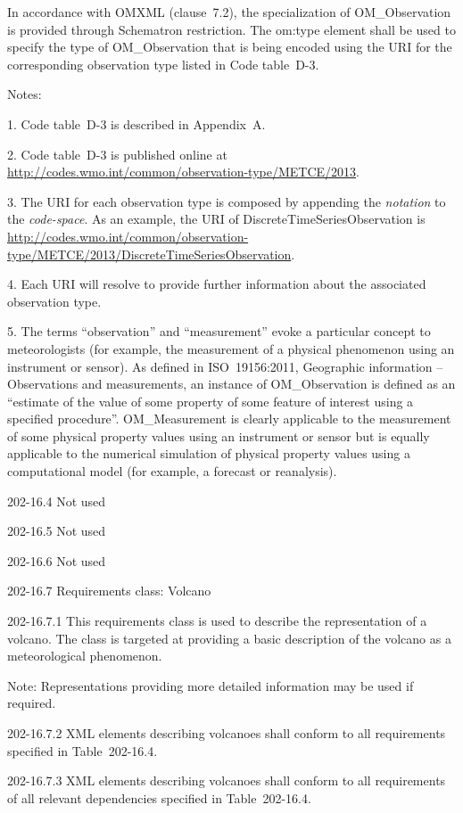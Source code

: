 In accordance with OMXML (clause~7.2), the specialization of OM\_Observation is provided through Schematron restriction. The om:type element shall be used to specify the type of OM\_Observation that is being encoded using the URI for the corresponding observation type listed in Code table~D-3.

Notes:

1. Code table~D-3 is described in Appendix~A.

2. Code table~D-3 is published online at \url{http://codes.wmo.int/common/observation-type/METCE/2013}.

3. The URI for each observation type is composed by appending the \emph{notation} to the \emph{code-space}. As an example, the URI of DiscreteTimeSeriesObservation is \url{http://codes.wmo.int/common/observation-type/METCE/2013/DiscreteTimeSeriesObservation}.

4. Each URI will resolve to provide further information about the associated observation type.

5. The terms ``observation'' and ``measurement'' evoke a particular concept to meteorologists (for example, the measurement of a physical phenomenon using an instrument or sensor). As defined in ISO~19156:2011, Geographic information -- Observations and measurements, an instance of OM\_Observation is defined as an ``estimate of the value of some property of some feature of interest using a specified procedure''. OM\_Measurement is clearly applicable to the measurement of some physical property values using an instrument or sensor but is equally applicable to the numerical simulation of physical property values using a computational model (for example, a forecast or reanalysis).

202-16.4 Not used

202-16.5 Not used

202-16.6 Not used

202-16.7 Requirements class: Volcano

202-16.7.1 This requirements class is used to describe the representation of a volcano. The class is targeted at providing a basic description of the volcano as a meteorological phenomenon.

Note: Representations providing more detailed information may be used if required.

202-16.7.2 XML elements describing volcanoes shall conform to all requirements specified in Table~202-16.4.

202-16.7.3 XML elements describing volcanoes shall conform to all requirements of all relevant dependencies specified in Table~202-16.4.


